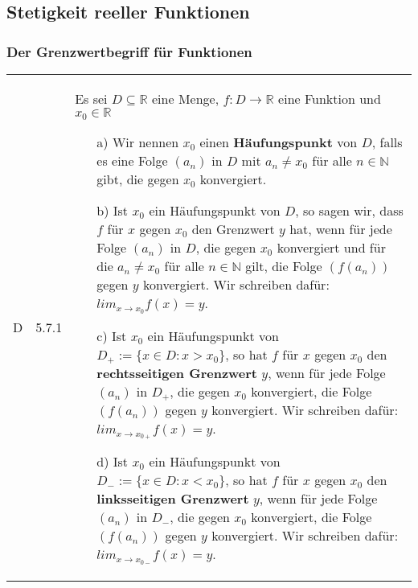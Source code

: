 \subsection{Stetigkeit reeller Funktionen}
\subsubsection{Der Grenzwertbegriff für Funktionen}

    \begin{longtable}{p{0.75cm} p{1cm} p{16cm}}
        \toprule

        D   & 5.7.1 &   Es sei $D \subseteq \mathbb{R}$ eine Menge, $f: D \rightarrow \mathbb{R}$ eine Funktion und $x_0 \in \mathbb{R}$
                        \begin{itemize}[topsep=-0.5cm]
                            \item[a)] Wir nennen $x_0$ einen \textbf{Häufungspunkt} von $D$, falls es eine Folge $(a_n)$ in $D$ mit
                                        $a_n \neq x_0$ für alle $n \in \mathbb{N}$ gibt, die gegen $x_0$ konvergiert.
                            \item[b)] Ist $x_0$ ein Häufungspunkt von $D$, so sagen wir, dass $f$ für $x$ gegen $x_0$ den Grenzwert 
                                        $y$ hat, wenn für jede Folge $(a_n)$ in $D$, die gegen $x_0$ konvergiert und für die
                                        $a_n \neq x_0$ für alle $n \in \mathbb{N}$ gilt, die Folge $(f(a_n))$ gegen $y$ konvergiert.
                                        \hfill \break Wir schreiben dafür: $lim_{x \rightarrow x_0} f(x) = y$.
                            \item[c)] Ist $x_0$ ein Häufungspunkt von $D_+ := \{ x \in D : x > x_0\}$, so hat $f$ für $x$ gegen $x_0$
                                        den \textbf{rechtsseitigen Grenzwert} $y$, wenn für jede Folge $(a_n)$ in $D_+$, die gegen
                                        $x_0$ konvergiert, die Folge $(f(a_n))$ gegen $y$ konvergiert.
                                        \hfill \break Wir schreiben dafür: $lim_{x \rightarrow x_{0+}} f(x) = y$.
                            \item[d)] Ist $x_0$ ein Häufungspunkt von $D_- := \{ x \in D : x < x_0\}$, so hat $f$ für $x$ gegen $x_0$
                                        den \textbf{linksseitigen Grenzwert} $y$, wenn für jede Folge $(a_n)$ in $D_-$, die gegen
                                        $x_0$ konvergiert, die Folge $(f(a_n))$ gegen $y$ konvergiert.
                                        \hfill \break Wir schreiben dafür: $lim_{x \rightarrow x_{0-}} f(x) = y$.

\end{itemize}
\end{longtable}
